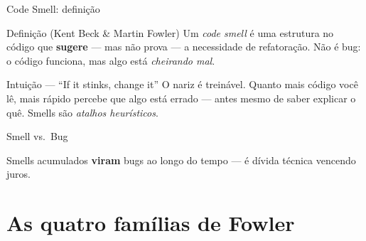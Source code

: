 \documentclass[aspectratio=169]{beamer}
\begin{document}
\begin{frame}{Code Smell: definição}
  \begin{block}{Definição (Kent Beck \& Martin Fowler)}
    Um \emph{code smell} é uma estrutura no código que \textbf{sugere}
    --- mas não prova --- a necessidade de refatoração.
    Não é bug: o código funciona, mas algo está \emph{cheirando mal}.
  \end{block}
  \begin{exampleblock}{Intuição --- ``If it stinks, change it''}
    O nariz é treinável. Quanto mais código você lê,
    mais rápido percebe que algo está errado --- antes
    mesmo de saber explicar o quê. Smells são \emph{atalhos heurísticos}.
  \end{exampleblock}
\end{frame}

\begin{frame}{Smell vs.\ Bug}
  \begin{center}
  \end{center}
  \vspace{0.4em}
  \footnotesize Smells acumulados \textbf{viram} bugs ao longo do tempo --- é dívida técnica vencendo juros.
\end{frame}

\section{As quatro famílias de Fowler}
\end{document}
